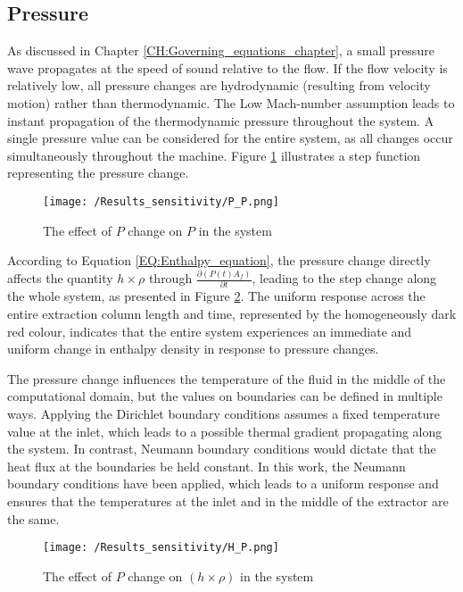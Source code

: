 \documentclass[../Article_Sensitivity_Analsysis.tex]{subfiles}
\begin{document}
	
	\subsection{Pressure}
	
	As discussed in Chapter \ref{CH:Governing_equations_chapter}, a small pressure wave propagates at the speed of sound relative to the flow. If the flow velocity is relatively low, all pressure changes are hydrodynamic (resulting from velocity motion) rather than thermodynamic. The Low Mach-number assumption leads to instant propagation of the thermodynamic pressure throughout the system. A single pressure value can be considered for the entire system, as all changes occur simultaneously throughout the machine. Figure \ref{fig:Sensitivty_P_P} illustrates a step function representing the pressure change.
	
	\begin{figure}[h!]
		\centering
		\texttt{[image: /Results\_sensitivity/P\_P.png]}
		\caption{The effect of $P$ change on $P$ in the system}
		\label{fig:Sensitivty_P_P}
	\end{figure}
	
	According to Equation \ref{EQ:Enthalpy_equation}, the pressure change directly affects the quantity $h \times \rho$ through $\frac{\partial (P(t) A_f)}{\partial t}$, leading to the step change along the whole system, as presented in Figure \ref{fig:Sensitivty_P_H}. The uniform response across the entire extraction column length and time, represented by the homogeneously dark red colour, indicates that the entire system experiences an immediate and uniform change in enthalpy density in response to pressure changes. 
	
	The pressure change influences the temperature of the fluid in the middle of the computational domain, but the values on boundaries can be defined in multiple ways. Applying the Dirichlet boundary conditions assumes a fixed temperature value at the inlet, which leads to a possible thermal gradient propagating along the system. In contrast, Neumann boundary conditions would dictate that the heat flux at the boundaries be held constant. In this work, the Neumann boundary conditions have been applied, which leads to a uniform response and ensures that the temperatures at the inlet and in the middle of the extractor are the same.
	
	\begin{figure}[h!]
		\centering
		\texttt{[image: /Results\_sensitivity/H\_P.png]}
		\caption{The effect of $P$ change on $(h \times \rho)$ in the system}
		\label{fig:Sensitivty_P_H}
	\end{figure}
	
\end{document}
